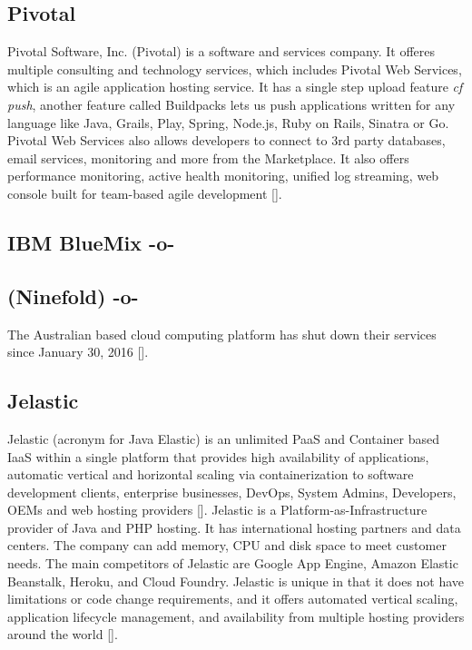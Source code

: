 \subsection{Pivotal}

Pivotal Software, Inc. (Pivotal) is a software and services
company. It offeres multiple consulting and technology services, which
includes Pivotal Web Services, which is an agile application hosting
service. It has a single step upload feature \textit{cf push}, another
feature called Buildpacks lets us push applications written for any
language like Java, Grails, Play, Spring, Node.js, Ruby on Rails,
Sinatra or Go. Pivotal Web Services also allows developers to connect
to 3rd party databases, email services, monitoring and more from the
Marketplace. It also offers performance monitoring, active health
monitoring, unified log streaming, web console built for team-based
agile development [\cite{pivotal-www}].

\subsection{IBM BlueMix -o-}



\subsection{ (Ninefold) -o-}

The Australian based cloud computing platform has shut down their
services since January 30, 2016 [\cite{www-ninefoldSite}].



\subsection{Jelastic}

Jelastic (acronym for Java Elastic) is an unlimited PaaS and Container
based IaaS within a single platform that provides high availability of
applications, automatic vertical and horizontal scaling via
containerization to software development clients, enterprise
businesses, DevOps, System Admins, Developers, OEMs and web hosting
providers [\cite{www-jelastic-2}]. Jelastic is a
Platform-as-Infrastructure provider of Java and PHP hosting.  It has
international hosting partners and data centers. The company can add
memory, CPU and disk space to meet customer needs. The main
competitors of Jelastic are Google App Engine, Amazon Elastic
Beanstalk, Heroku, and Cloud Foundry. Jelastic is unique in that it
does not have limitations or code change requirements, and it offers
automated vertical scaling, application lifecycle management, and
availability from multiple hosting providers around the
world [\cite{www-jelastic-1}].

